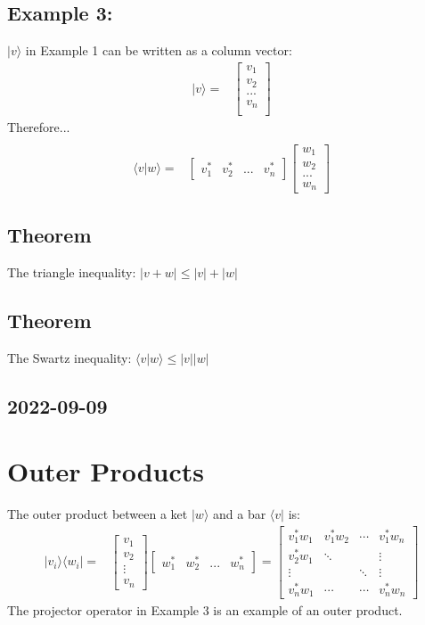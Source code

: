 \documentclass[12pt]{article}
\begin{document}
\subsection*{Example 3:}
$|v\rangle$ in Example 1 can be written as a column vector:
\begin{align*}
|v\rangle =&
\begin{bmatrix}
v_1\\
v_2\\
...\\
v_n\\
\end{bmatrix}
\end{align*}
Therefore...
\begin{align*}\\
\langle v|w \rangle =&  
\begin{bmatrix}
v_1^*&v_2^*&...&v_n^*
\end{bmatrix}
\begin{bmatrix}
w_1\\
w_2\\
...\\
w_n
\end{bmatrix}
\end{align*}

\subsection*{Theorem}
The triangle inequality: $|v+w| \leq |v| + |w|$

\subsection*{Theorem}
The Swartz inequality: $\langle v|w \rangle \leq |v||w|$

\subsection*{2022-09-09}

\section{Outer Products}
The outer product between a ket $|w\rangle$ and a bar $\langle v|$ is:
\begin{align*}
|v_i\rangle\langle w_i| =& 
\begin{bmatrix}
v_1\\v_2\\ \vdots \\v_n
\end{bmatrix}
\begin{bmatrix}
w_1^*&w_2^*&...&w_n^*
\end{bmatrix}
= 
\begin{bmatrix}
v_1^*w_1 & v_1^*w_2  &  \cdots & v_1^*w_n \\	
v_2^*w_1 & \ddots    &         & \vdots \\
\vdots &             &  \ddots & \vdots\\
v_n^*w_1 & \cdots    &  \cdots & v_n^*w_n
\end{bmatrix}
\end{align*}
The projector operator in Example 3 is an example of an outer product.
\end{document}
